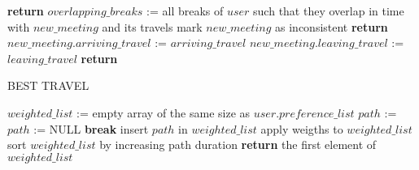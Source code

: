 \begin{algorithm}
\begin{algorithmic}[1]
					\State \textbf{return}				
				\EndIf
			\EndIf
		\EndIf
		\State $overlapping\_breaks$ := all breaks of $user$ such that they overlap in time with $new\_meeting$ and its travels
			\State {}
				\State mark $new\_meeting$ as inconsistent
				\State \textbf{return}	
			\EndIf
		\EndFor
		\State $new\_meeting.arriving\_travel$ := $arriving\_travel$
		\State $new\_meeting.leaving\_travel$ := $leaving\_travel$
		\State \textbf{return}
	\EndFunction
	\end{algorithmic}
\addtocounter{algorithm}{-1}
\end{algorithm}

\begin{algorithm}
\renewcommand\thealgorithm{}
\caption{BEST TRAVEL}
	\begin{algorithmic}[1]
		\State $weighted\_list$ := empty array of the same size as $user.preference\_list$
			\State $path$ := 
					\State $path$ := NULL
					\State \textbf{break}
				\EndIf
			\EndFor
				\State insert $path$ in $weighted\_list$
			\EndIf
		\EndFor
		\State apply weigths to $weighted\_list$
		\State sort $weighted\_list$ by increasing path duration
		\State \textbf{return} the first element of $weighted\_list$
	\EndFunction
	\end{algorithmic}
\addtocounter{algorithm}{-1}
\end{algorithm}